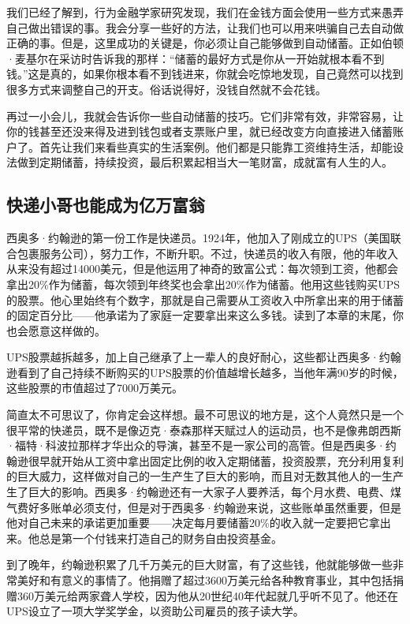 我们已经了解到，行为金融学家研究发现，我们在金钱方面会使用一些方式来愚弄自己做出错误的事。我会分享一些好的方法，让我们也可以用来哄骗自己去自动做正确的事。但是，这里成功的关键是，你必须让自己能够做到自动储蓄。正如伯顿·麦基尔在采访时告诉我的那样：“储蓄的最好方式是你从一开始就根本看不到钱。”这是真的，如果你根本看不到钱进来，你就会吃惊地发现，自己竟然可以找到很多方式来调整自己的开支。俗话说得好，没钱自然就不会花钱。

再过一小会儿，我就会告诉你一些自动储蓄的技巧。它们非常有效，非常容易，让你的钱甚至还没来得及进到钱包或者支票账户里，就已经改变方向直接进入储蓄账户了。首先让我们来看些真实的生活案例。他们都是只能靠工资维持生活，却能设法做到定期储蓄，持续投资，最后积累起相当大一笔财富，成就富有人生的人。

\subsection{快递小哥也能成为亿万富翁}

西奥多·约翰逊的第一份工作是快递员。1924年，他加入了刚成立的UPS（美国联合包裹服务公司），努力工作，不断升职。不过，快递员的收入有限，他的年收入从来没有超过14000美元，但是他运用了神奇的致富公式：每次领到工资，他都会拿出20\%作为储蓄，每次领到年终奖也会拿出20\%作为储蓄。他用这些钱购买UPS的股票。他心里始终有个数字，那就是自己需要从工资收入中所拿出来的用于储蓄的固定百分比——他承诺为了家庭一定要拿出来这么多钱。读到了本章的末尾，你也会愿意这样做的。

UPS股票越拆越多，加上自己继承了上一辈人的良好耐心，这些都让西奥多·约翰逊看到了自己持续不断购买的UPS股票的价值越增长越多，当他年满90岁的时候，这些股票的市值超过了7000万美元。

简直太不可思议了，你肯定会这样想。最不可思议的地方是，这个人竟然只是一个很平常的快递员，既不是像迈克·泰森那样天赋过人的运动员，也不是像弗朗西斯·福特·科波拉那样才华出众的导演，甚至不是一家公司的高管。但是西奥多·约翰逊很早就开始从工资中拿出固定比例的收入定期储蓄，投资股票，充分利用复利的巨大威力，这样做对自己的一生产生了巨大的影响，而且对无数其他人的一生产生了巨大的影响。西奥多·约翰逊还有一大家子人要养活，每个月水费、电费、煤气费好多账单必须支付，但是对于西奥多·约翰逊来说，这些账单虽然重要，但是他对自己未来的承诺更加重要——决定每月要储蓄20\%的收入就一定要把它拿出来。他总是第一个付钱来打造自己的财务自由投资基金。

到了晚年，约翰逊积累了几千万美元的巨大财富，有了这些钱，他就能够做一些非常美好和有意义的事情了。他捐赠了超过3600万美元给各种教育事业，其中包括捐赠360万美元给两家聋人学校，因为他从20世纪40年代起就几乎听不见了。他还在UPS设立了一项大学奖学金，以资助公司雇员的孩子读大学。

